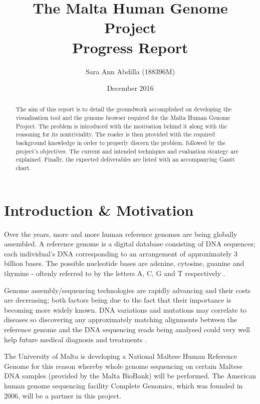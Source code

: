 \documentclass{csfyp}
\title{The Malta Human Genome Project \\
  \large Progress Report}
\author{Sara Ann Abdilla (188396M)}
\date{December 2016}
\begin{document}
\tableofcontents

\newpage

\setcounter{page}{1}


\begin{abstract}
The aim of this report is to detail the groundwork accomplished on developing the visualisation tool and the genome browser required for the Malta Human Genome Project.  The problem is introduced with the motivation behind it along with the reasoning for its nontriviality.  The reader is then provided with the required background knowledge in order to properly discern the problem, followed by the project's objectives.  The current and intended techniques and evaluation strategy are explained.  Finally, the expected deliverables are listed with an accompanying Gantt chart.   
\end{abstract}


\section{Introduction \& Motivation}
\label{s:intro}

Over the years, more and more human reference genomes are being globally assembled.  A reference genome is a digital database consisting of DNA sequences; each individual's DNA corresponding to an arrangement of approximately 3 billion bases.  The possible nucleotide bases are adenine, cytosine, guanine and thymine - oftenly referred to by the letters A, C, G and T respectively \cite{aiBk, introgenom}.  

Genome assembly/sequencing technologies are rapidly advancing and their costs are decreasing; both factors being due to the fact that their importance is becoming more widely known.  DNA variations and mutations may correlate to diseases so discovering any approximately matching alignments between the reference genome and the DNA sequencing reads being analysed could very well help future medical diagnosis and treatments \cite{think}.

The University of Malta is developing a National Maltese Human Reference Genome for this reason whereby whole genome sequencing on certain Maltese DNA samples (provided by the Malta BioBank) will be performed.  The American human genome sequencing facility Complete Genomics, which was founded in 2006, will be a partner in this project. 
\end{document}
